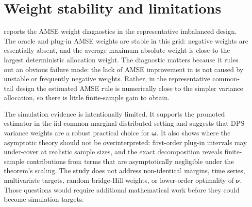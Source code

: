 \begin{table}[htbp]
\centering
\small
\caption{Threshold sensitivity for \(m=10\), strong allocation and \(np=5\).}
\label{tab:sim:threshold}
\begingroup
\setlength{\tabcolsep}{4pt}

\endgroup
\end{table}

\begin{table}[htbp]
\centering
\small
\caption{Target sensitivity for \(m=10\), strong allocation and
\(k_j/n_j=0.05\).}
\label{tab:sim:target}
\begingroup
\setlength{\tabcolsep}{4pt}

\endgroup
\end{table}

\section{Weight stability and limitations}
\label{sec:sim:limitations}

 reports the AMSE weight diagnostics in the
representative imbalanced design. The oracle and plug-in AMSE weights are
stable in this grid: negative weights are essentially absent, and the average
maximum absolute weight is close to the largest deterministic allocation
weight. The diagnostic matters because it rules out an obvious failure mode:
the lack of AMSE improvement in  is not caused by
unstable or frequently negative weights. Rather, in the representative
common-tail design the estimated AMSE rule is numerically close to the simpler
variance allocation, so there is little finite-sample gain to obtain.

The simulation evidence is intentionally limited. It supports the promoted
estimator in the iid common-marginal distributed setting and suggests that
DPS variance weights are a robust practical choice for \(\bm\omega\). It
also shows where the asymptotic theory should not be overinterpreted:
first-order plug-in intervals may under-cover at realistic sample sizes, and
the exact decomposition reveals finite-sample contributions from terms that are
asymptotically negligible under the theorem's scaling. The study does not
address non-identical margins, time series, multivariate targets, random
bridge-Hill weights, or lower-order optimality of \(\bm\nu\). Those questions
would require additional mathematical work before they could become
simulation targets.

\begin{table}[htbp]
\centering
\small
\caption{AMSE weight diagnostics in the representative main design.}
\label{tab:sim:weights}
\begingroup
\setlength{\tabcolsep}{4pt}

\endgroup
\end{table}
